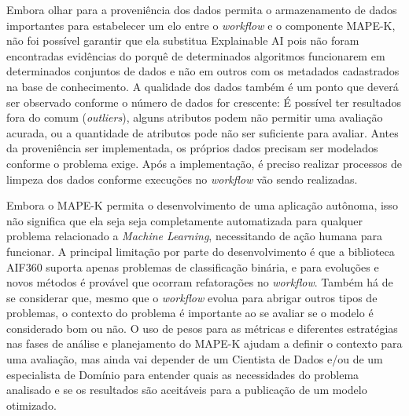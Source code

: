 \documentclass[twocolumn]{article}
\begin{document}
Embora olhar para a proveniência dos dados permita o armazenamento de dados importantes para estabelecer um elo entre o \textit{workflow} e o componente MAPE-K, não foi possível garantir que ela substitua Explainable AI pois não foram encontradas evidências do porquê de determinados algoritmos funcionarem em determinados conjuntos de dados e não em outros com os metadados cadastrados na base de conhecimento. A qualidade dos dados também é um ponto que deverá ser observado conforme o número de dados for crescente: É possível ter resultados fora do comum (\textit{outliers}), alguns atributos podem não permitir uma avaliação acurada, ou a quantidade de atributos pode não ser suficiente para avaliar. Antes da proveniência ser implementada, os próprios dados precisam ser modelados conforme o problema exige. Após a implementação, é preciso realizar processos de limpeza dos dados conforme execuções no \textit{workflow} vão sendo realizadas.

Embora o MAPE-K permita o desenvolvimento de uma aplicação autônoma, isso não significa que ela seja seja completamente automatizada para qualquer problema relacionado a \textit{Machine Learning}, necessitando de ação humana para funcionar. A principal limitação por parte do desenvolvimento é que a biblioteca AIF360 suporta apenas problemas de classificação binária, e para evoluções e novos métodos é provável que ocorram refatorações no \textit{workflow}. Também há de se considerar que, mesmo que o \textit{workflow} evolua para abrigar outros tipos de problemas, o contexto do problema é importante ao se avaliar se o modelo é considerado bom ou não. O uso de pesos para as métricas e diferentes estratégias nas fases de análise e planejamento do MAPE-K ajudam a definir o contexto para uma avaliação, mas ainda vai depender de um Cientista de Dados e/ou de um especialista de Domínio para entender quais as necessidades do problema analisado e se os resultados são aceitáveis para a publicação de um modelo otimizado.



\end{document}
